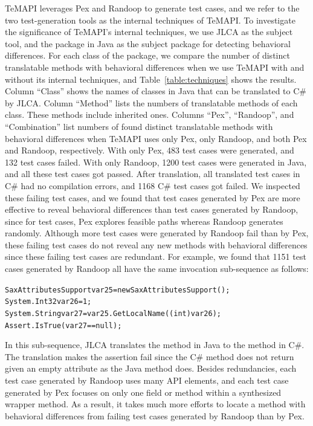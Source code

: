 TeMAPI leverages Pex and Randoop to generate test cases, and we refer to the two test-generation tools as the internal techniques of TeMAPI. To investigate the significance of TeMAPI's internal techniques, we use JLCA as the subject tool, and the  package in Java as the subject package for detecting behavioral differences. For each class of the package, we compare the number of distinct translatable methods with behavioral differences when we use TeMAPI with and without its internal techniques, and Table~\ref{table:techniques} shows the results. Column ``Class'' shows the names of classes in Java that can be translated to C\# by JLCA. Column ``Method'' lists the numbers of translatable methods of each class. These methods include inherited ones. Columns ``Pex'', ``Randoop'', and ``Combination'' list numbers of found distinct translatable methods with behavioral differences when TeMAPI uses only Pex, only Randoop, and both Pex and Randoop, respectively. With only Pex, 483 test cases were generated, and 132 test cases failed. With only Randoop, 1200 test cases were generated in Java, and all these test cases got passed. After translation, all translated test cases in C\# had no compilation errors, and 1168 C\# test cases got failed. We inspected these failing test cases, and we found that test cases generated by Pex are more effective to reveal behavioral differences than test cases generated by Randoop, since for test cases, Pex explores feasible paths whereas Randoop generates randomly. Although more test cases were generated by Randoop fail than by Pex, these failing test cases do not reveal any new methods with behavioral differences since these failing test cases are redundant. For example, we found that 1151 test cases generated by Randoop all have the same invocation sub-sequence as follows:

\begin{CodeOut}%
\begin{alltt}
SaxAttributesSupport var25 = new SaxAttributesSupport();
System.Int32 var26 = 1;
System.String var27 = var25.GetLocalName((int) var26);
Assert.IsTrue(var27 == null);
\end{alltt}
\end{CodeOut}%

In this sub-sequence, JLCA translates the  method in Java to the  method in C\#. The translation makes the assertion fail since the C\# method does not return  given an empty attribute as the Java method does. Besides redundancies, each test case generated by Randoop uses many API elements, and each test case generated by Pex focuses on only one field or method within a synthesized wrapper method. As a result, it takes much more efforts to locate a method with behavioral differences from failing test cases generated by Randoop than by Pex.


